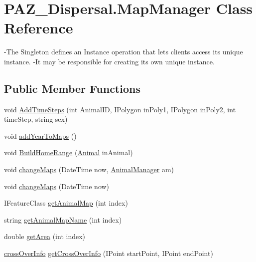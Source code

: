 \hypertarget{class_p_a_z___dispersal_1_1_map_manager}{\section{P\-A\-Z\-\_\-\-Dispersal.\-Map\-Manager Class Reference}
\label{class_p_a_z___dispersal_1_1_map_manager}
}


-\/\-The Singleton defines an Instance operation that lets clients access its unique instance. -\/\-It may be responsible for creating its own unique instance.  


\subsection*{Public Member Functions}
\begin{DoxyCompactItemize}
\item 
void \hyperlink{class_p_a_z___dispersal_1_1_map_manager_a32297816a2eae43e60c2f0bfac768bdd}{Add\-Time\-Steps} (int Animal\-I\-D, I\-Polygon in\-Poly1, I\-Polygon in\-Poly2, int time\-Step, string sex)
\item 
void \hyperlink{class_p_a_z___dispersal_1_1_map_manager_a3a43673be7aa46110f50ffc3928bb618}{add\-Year\-To\-Maps} ()
\item 
void \hyperlink{class_p_a_z___dispersal_1_1_map_manager_a5eb41b396f99a6d93ec188d7769bc29c}{Build\-Home\-Range} (\hyperlink{class_p_a_z___dispersal_1_1_animal}{Animal} in\-Animal)
\item 
void \hyperlink{class_p_a_z___dispersal_1_1_map_manager_afbf3b9ee22de6048b336efe818996a04}{change\-Maps} (Date\-Time now, \hyperlink{class_p_a_z___dispersal_1_1_animal_manager}{Animal\-Manager} am)
\item 
void \hyperlink{class_p_a_z___dispersal_1_1_map_manager_a0eb8b57d8273e4e78f7ad9464fc044d4}{change\-Maps} (Date\-Time now)
\item 
I\-Feature\-Class \hyperlink{class_p_a_z___dispersal_1_1_map_manager_aec123ec3b343c110fd5618e2f45f2a49}{get\-Animal\-Map} (int index)
\item 
string \hyperlink{class_p_a_z___dispersal_1_1_map_manager_a2ac8de0200c743af92d9bceaa9e6e4de}{get\-Animal\-Map\-Name} (int index)
\item 
double \hyperlink{class_p_a_z___dispersal_1_1_map_manager_a196615bbae850168e246480e82f02434}{get\-Area} (int index)
\item 
\hyperlink{class_p_a_z___dispersal_1_1cross_over_info}{cross\-Over\-Info} \hyperlink{class_p_a_z___dispersal_1_1_map_manager_a1102ca53f4fe8ef6d9b5f46679b71f03}{get\-Cross\-Over\-Info} (I\-Point start\-Point, I\-Point end\-Point)

\end{DoxyCompactItemize}
